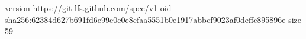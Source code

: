 version https://git-lfs.github.com/spec/v1
oid sha256:62384d627b691fd6e99e0e0e8cfaa5551b0e1917abbcf9023af0deffc895896e
size 59
